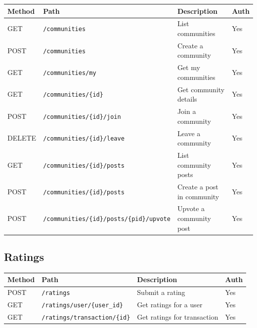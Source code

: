 \documentclass[11pt,a4paper]{report}
\begin{document}
\begin{longtable}{|l|p{6.5cm}|p{5cm}|l|}
    \hline
    \textbf{Method} & \textbf{Path}                                     & \textbf{Description}       & \textbf{Auth} \\
    \hline
    \endhead
    GET             & \texttt{/communities}                             & List communities           & Yes           \\
    \hline
    POST            & \texttt{/communities}                             & Create a community         & Yes           \\
    \hline
    GET             & \texttt{/communities/my}                          & Get my communities         & Yes           \\
    \hline
    GET             & \texttt{/communities/\{id\}}                      & Get community details      & Yes           \\
    \hline
    POST            & \texttt{/communities/\{id\}/join}                 & Join a community           & Yes           \\
    \hline
    DELETE          & \texttt{/communities/\{id\}/leave}                & Leave a community          & Yes           \\
    \hline
    GET             & \texttt{/communities/\{id\}/posts}                & List community posts       & Yes           \\
    \hline
    POST            & \texttt{/communities/\{id\}/posts}                & Create a post in community & Yes           \\
    \hline
    POST            & \texttt{/communities/\{id\}/posts/\{pid\}/upvote} & Upvote a community post    & Yes           \\
    \hline
\end{longtable}

\subsection{Ratings}

\begin{longtable}{|l|p{6.5cm}|p{5cm}|l|}
    \hline
    \textbf{Method} & \textbf{Path}                        & \textbf{Description}        & \textbf{Auth} \\
    \hline
    \endhead
    POST            & \texttt{/ratings}                    & Submit a rating             & Yes           \\
    \hline
    GET             & \texttt{/ratings/user/\{user\_id\}}  & Get ratings for a user      & Yes           \\
    \hline
    GET             & \texttt{/ratings/transaction/\{id\}} & Get ratings for transaction & Yes           \\
    \hline
\end{longtable}
\end{document}
